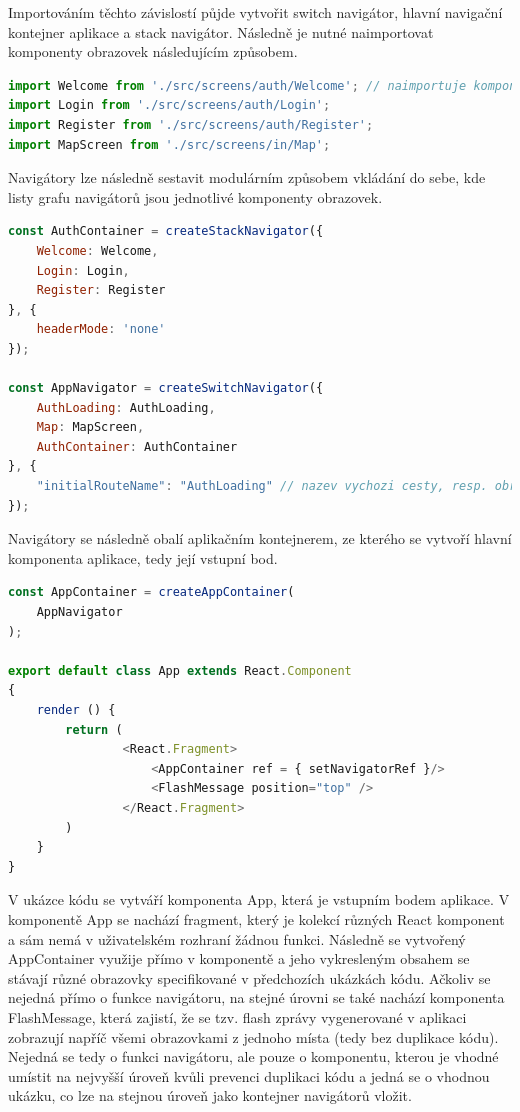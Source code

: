 Importováním těchto závislostí půjde vytvořit switch navigátor, hlavní navigační kontejner aplikace a stack navigátor. Následně je nutné naimportovat komponenty obrazovek následujícím způsobem.

\begin{lstlisting}[language=JavaScript, caption=Import obrazovek pro hlavní navigátor]
import Welcome from './src/screens/auth/Welcome'; // naimportuje komponentu obrazovky Welcome
import Login from './src/screens/auth/Login';
import Register from './src/screens/auth/Register';
import MapScreen from './src/screens/in/Map';
\end{lstlisting}

Navigátory lze následně sestavit modulárním způsobem vkládání do sebe, kde listy grafu navigátorů jsou jednotlivé komponenty obrazovek.

\begin{lstlisting}[language=JavaScript, caption=Implementace navigátorů]
const AuthContainer = createStackNavigator({
	Welcome: Welcome,
	Login: Login,
	Register: Register
}, {
	headerMode: 'none'
});

const AppNavigator = createSwitchNavigator({
	AuthLoading: AuthLoading,
	Map: MapScreen,
	AuthContainer: AuthContainer
}, {
	"initialRouteName": "AuthLoading" // nazev vychozi cesty, resp. obrazovkove komponenty
});
\end{lstlisting}

Navigátory se následně obalí aplikačním kontejnerem, ze kterého se vytvoří hlavní komponenta aplikace, tedy její vstupní bod.

\begin{lstlisting}[language=JavaScript, caption=Vytvoření aplikačního kontejneru]
const AppContainer = createAppContainer(
	AppNavigator
);

export default class App extends React.Component
{
	render () {
		return (
				<React.Fragment>
					<AppContainer ref = { setNavigatorRef }/>
					<FlashMessage position="top" />
				</React.Fragment>
		)
	}
}
\end{lstlisting}

V ukázce kódu se vytváří komponenta App, která je vstupním bodem aplikace. V komponentě App se nachází fragment, který je kolekcí různých React komponent a sám nemá v uživatelském rozhraní žádnou funkci. Následně se vytvořený AppContainer využije přímo v komponentě a jeho vykresleným obsahem se stávají různé obrazovky specifikované v předchozích ukázkách kódu. Ačkoliv se nejedná přímo o funkce navigátoru, na stejné úrovni se také nachází komponenta FlashMessage, která zajistí, že se tzv. flash zprávy vygenerované v aplikaci zobrazují napříč všemi obrazovkami z jednoho místa (tedy bez duplikace kódu). Nejedná se tedy o funkci navigátoru, ale pouze o komponentu, kterou je vhodné umístit na nejvyšší úroveň kvůli prevenci duplikaci kódu a jedná se o vhodnou ukázku, co lze na stejnou úroveň jako kontejner navigátorů vložit.

